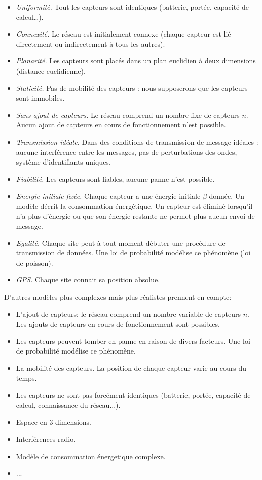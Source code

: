 \begin{itemize}
 \item \textit{Uniformité.} Tout les capteurs sont identiques (batterie, portée, capacité de calcul…).
 \item \textit{Connexité.} Le réseau est initialement connexe (chaque capteur est lié directement ou indirectement à tous les autres).
 \item \textit{Planarité.} Les capteurs sont placés dans un plan euclidien à deux dimensions (distance euclidienne).
 \item \textit{Staticité.} Pas de mobilité des capteurs : nous supposerons que les capteurs sont immobiles.
 \item \textit{Sans ajout de capteurs.} Le réseau comprend un nombre fixe de capteurs $n$. Aucun ajout de capteurs en cours de fonctionnement n'est possible.
 \item \textit{Transmission idéale.} Dans des conditions de transmission de message idéales : aucune interférence entre les messages, pas de perturbations des ondes, système d'identifiants uniques.
 \item \textit{Fiabilité.} Les capteurs sont fiables, aucune panne n'est possible.
 \item \textit{Energie initiale fixée.} Chaque capteur a une énergie initiale $\beta$ donnée. Un modèle décrit la consommation énergétique. Un capteur est éliminé lorsqu'il n'a plus d'énergie ou que son énergie 
 restante ne permet plus aucun envoi de message. 
 \item \textit{Egalité.} Chaque site peut à tout moment débuter une procédure de transmission de données. Une loi de probabilité modélise ce phénomène (loi de poisson).
 \item \textit{GPS.} Chaque site connait sa position absolue.  \\
\end{itemize}

D'autres modèles plus complexes mais plus réalistes prennent en compte:
  
\begin{itemize}
   
 \item L'ajout de capteurs: le réseau comprend un nombre variable de capteurs $n$. Les ajouts de capteurs en cours de fonctionnement sont possibles.
 \item Les capteurs peuvent tomber en panne en raison de divers facteurs. Une loi de probabilité modélise ce phénomène.   
 \item La mobilité des capteurs. La position de chaque capteur varie au cours du temps.
 \item Les capteurs ne sont pas forcément identiques (batterie, portée, capacité de calcul, connaissance du réseau...).
 \item Espace en 3 dimensions.
 \item Interférences radio.
 \item Modèle de consommation énergetique complexe.
 \item ...
\end{itemize}


